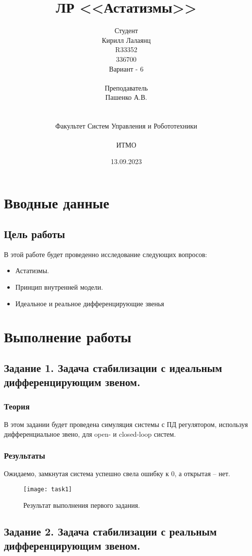 \documentclass[16pt]{article}
\title{ЛР \textnumero 4 <<Астатизмы>>}
\author{
Студент \\
Кирилл Лалаянц\\
R33352\\
336700\\
Вариант - 6\\
\\
Преподаватель\\
Пашенко А.В. \\
\\
\\
Факультет Систем Управления и Робототехники\\
\\
ИТМО\\
}
\date{13.09.2023}
\begin{document}
\maketitle
\newpage
\tableofcontents
\thispagestyle{empty}

\newpage
\setcounter{page}{1}
\section{Вводные данные}
\subsection{Цель работы}
В этой работе будет проведенно исследование следующих вопросов:
\begin{itemize}
    \item Астатизмы.
    \item Принцип внутренней модели.
    \item Идеальное и реальное дифференцирующие звенья
\end{itemize} 

\newpage
\section{Выполнение работы}
\label{sec:headings}


\subsection{Задание 1. Задача стабилизации с идеальным дифференцирующим звеном.}

\subsubsection{Теория}
В этом задании будет проведена симуляция системы с ПД регулятором, используя дифференциальное звено, для open- и closed-loop систем.
\subsubsection{Результаты}
Ожидаемо, замкнутая система успешно свела ошибку к 0, а открытая -- нет.
\begin{figure}[h!]
    \centering
    \texttt{[image: task1]}
    \caption{Результат выполнения первого задания.}
    \label{fig:fig1}
\end{figure}

\pagebreak

\subsection{Задание 2. Задача стабилизации с реальным дифференцирующим звеном.}
\end{document}
